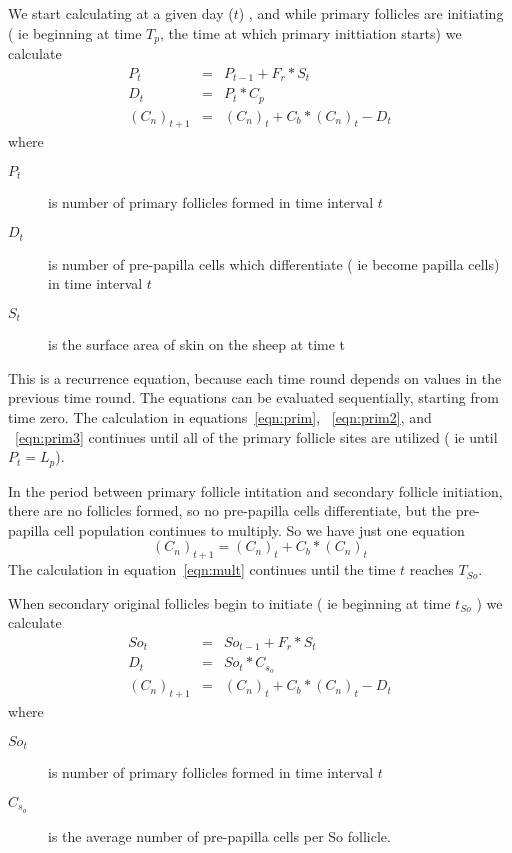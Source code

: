 \documentclass[titlepage]{article}  %
\begin{document}
We start calculating at a given day ($t$) , and while primary follicles are initiating ( ie beginning at time $T_{p}$, the time at which primary inittiation starts) we calculate
\begin{eqnarray}
\label{eqn:prim}
P_{t} & = & P_{t-1} +  F_{r} * S_{t} \\
\label{eqn:prim2}
D_{t} & = & P_{t} * C_{p} \\
\label{eqn:prim3}
(C_{n})_{t+1} & = & (C_{n})_{t} + C_{b} * (C_{n})_{t} - D_{t}
\end{eqnarray}
where 
\begin{description}
\item[$P_{t}$] is number of primary follicles formed in time interval $t$
\item[$D_{t}$] is number of pre-papilla cells which differentiate ( ie become papilla cells) in time interval $t$
\item[$S_{t}$] is the surface area of skin on the sheep at time t
\end{description}
This is a recurrence equation, because each time round depends on values in the previous time round. The equations can be evaluated sequentially, starting from time zero. The calculation in equations~\ref{eqn:prim}, ~\ref{eqn:prim2}, and ~\ref{eqn:prim3} continues until all of the primary follicle sites are utilized ( ie until $ P_{t} = L_{p} $). 

In the period between primary follicle intitation and secondary follicle initiation, there are no follicles formed, so no pre-papilla cells differentiate, but the pre-papilla cell population continues to multiply. So we have just one equation
\begin{equation}
\label{eqn:mult}
(C_{n})_{t+1}  =  (C_{n})_{t} + C_{b} * (C_{n})_{t}
\end{equation}
The calculation in equation~\ref{eqn:mult} continues until the time $t$ reaches  $T_{So}$.

When secondary original follicles begin to initiate ( ie beginning at time $t_{So}$ ) we calculate
\begin{eqnarray}
\label{eqn:so}
So_{t} & = & So_{t-1} +  F_{r} * S_{t} \\
\label{eqn:so2}
D_{t} & = & So_{t} * C_{s_{o}} \\
\label{eqn:so3}
(C_{n})_{t+1} & = & (C_{n})_{t} + C_{b} * (C_{n})_{t} - D_{t}
\end{eqnarray}
where
\begin{description}
\item[$So_{t}$] is number of primary follicles formed in time interval $t$
\item[$C_{s_{o}}$] is the average number of pre-papilla cells per So follicle.
\end{description}
\end{document}
